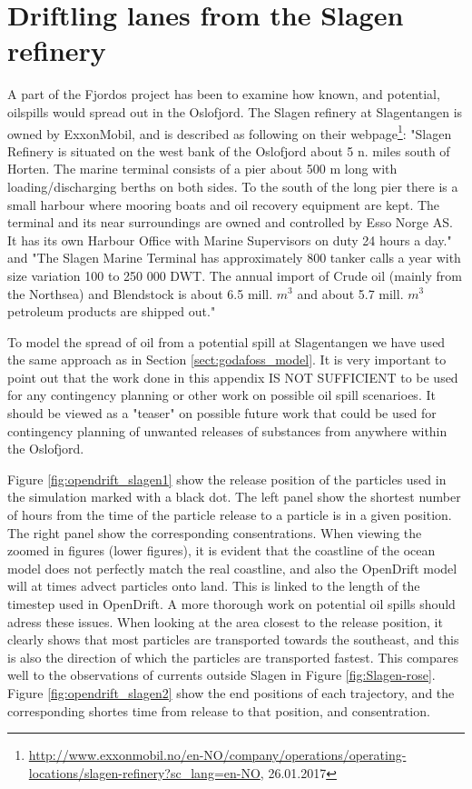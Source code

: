 \section*{Driftling lanes from the Slagen refinery}
A part of the Fjordos project has been to examine how known, and potential, oilspills would spread out in the Oslofjord. The Slagen refinery at Slagentangen is owned by ExxonMobil, and is described as following on their webpage\footnote{\url{http://www.exxonmobil.no/en-NO/company/operations/operating-locations/slagen-refinery?sc_lang=en-NO}, 26.01.2017}: "Slagen Refinery is situated on the west bank of the Oslofjord about 5 n. miles south of Horten. The marine terminal consists of a pier about 500 m long with loading/discharging berths on both sides. To the south of the long pier there is a small harbour where mooring boats and oil recovery equipment are kept. The terminal and its near surroundings are owned and controlled by Esso Norge AS. It has its own Harbour Office with Marine Supervisors on duty 24 hours a day." and "The Slagen Marine Terminal has approximately 800 tanker calls a year with size variation 100 to 250 000 DWT. The annual import of Crude oil (mainly from the Northsea) and Blendstock is about 6.5 mill. $m^3$ and about 5.7 mill. $m^3$ petroleum products are shipped out."

To model the spread of oil from a potential spill at Slagentangen we have used the same approach as in Section \ref{sect:godafoss_model}. It is very important to point out that the work done in this appendix IS NOT SUFFICIENT to be used for any contingency planning or other work on possible oil spill scenarioes. It should be viewed as a "teaser" on possible future work that could be used for contingency planning of unwanted releases of substances from anywhere within the Oslofjord.

Figure \ref{fig:opendrift_slagen1} show the release position of the particles used in the simulation marked with a black dot.  The left panel show the shortest number of hours from the time of the particle release to a particle is in a given position. The right panel show the corresponding consentrations. When viewing the zoomed in figures (lower figures), it is evident that the coastline of the ocean model does not perfectly match the real coastline, and also the OpenDrift model will at times advect particles onto land. This is linked to the length of the timestep used in OpenDrift. A more thorough work on potential oil spills should adress  these issues.
When looking at the area closest to the release position, it clearly shows that most particles are transported towards the southeast, and this is also the direction of which the particles are transported fastest. This compares well to the observations of currents outside Slagen in Figure \ref{fig:Slagen-rose}.
Figure \ref{fig:opendrift_slagen2} show the end positions of each trajectory, and the corresponding shortes time from release to that position, and consentration.

